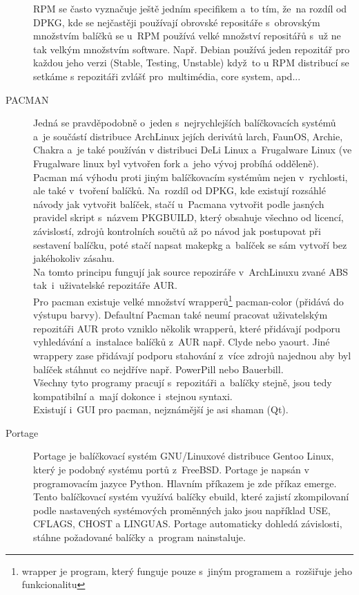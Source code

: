 \documentclass[a4paper,12pt]{article}
\begin{document}
\begin{description}
RPM se často vyznačuje ještě jedním specifikem a~to tím, že~na rozdíl od DPKG, kde se nejčastěji používají obrovské repositáře s~obrovským množstvím balíčků se u~RPM používá velké množství repositářů s~už ne tak velkým množstvím software. Např. Debian používá jeden repozitář pro každou jeho verzi (Stable, Testing, Unstable) když~to u RPM distribucí se setkáme s repozitáři zvlášť pro~multimédia, core system, apd...
 \item[PACMAN] Jedná se pravděpodobně o~jeden s~nejrychlejších balíčkovacích systémů a~je součástí distribuce ArchLinux jejích derivátů larch, FaunOS, Archie, Chakra a~je také používán v distribuci DeLi Linux a~Frugalware Linux (ve Frugalware linux byl vytvořen fork a~jeho vývoj probíhá odděleně). Pacman má výhodu proti jiným balíčkovacím systémům nejen v~rychlosti, ale také v~tvoření balíčků. Na~rozdíl od DPKG, kde existují rozsáhlé návody jak vytvořit balíček, stačí u~Pacmana vytvořit podle jasných pravidel skript s~názvem PKGBUILD, který obsahuje všechno od licencí, závislostí, zdrojů kontrolních součtů až po návod jak postupovat při sestavení balíčku, poté stačí napsat makepkg a~balíček se sám vytvoří bez jakéhokoliv zásahu.\\
Na tomto principu fungují jak source repoziráře v~ArchLinuxu zvané ABS tak~i~uživatelské repozitáře AUR.\\

Pro pacman existuje velké množství wrapperů\footnote{wrapper je program, který funguje pouze s~jiným programem a~rozšiřuje jeho funkcionalitu} pacman-color (přidává do výstupu barvy). Defaultní Pacman také neumí pracovat uživatelským repozitáři AUR proto vzniklo několik wrapperů, které přidávají podporu vyhledávání a~instalace balíčků z~AUR např. Clyde nebo yaourt. Jiné wrappery zase přidávají podporu stahování z~více zdrojů najednou aby byl balíček stáhnut co nejdříve např. PowerPill nebo Bauerbill.\\

Všechny tyto programy pracují s~repozitáři a~balíčky stejně, jsou tedy kompatibilní a~mají dokonce i~stejnou syntaxi.\\

Existují i~GUI pro pacman, nejznámější je asi shaman (Qt).
 \item[Portage] Portage je balíčkovací systém GNU/Linuxové distribuce Gentoo Linux, který je podobný systému portů z~FreeBSD. Portage je napsán v programovacím jazyce Python. Hlavním příkazem je zde příkaz emerge. Tento balíčkovací systém využívá balíčky ebuild, které zajistí zkompilovaní podle nastavených systémových proměnných jako jsou například USE, CFLAGS, CHOST a LINGUAS. Portage automaticky dohledá závislosti, stáhne požadované balíčky a~program nainstaluje.\\


\end{description}
\end{document}
